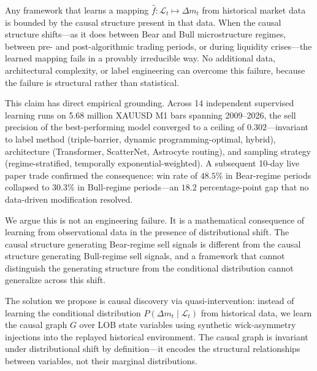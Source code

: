 \documentclass[12pt]{article}
\begin{document}
Any framework that learns a mapping
$\hat{f}: \mathcal{L}_t \mapsto \Delta m_t$
from historical market data is bounded by the causal structure
present in that data.
When the causal structure shifts---as it does between Bear and Bull
microstructure regimes, between pre- and post-algorithmic trading
periods, or during liquidity crises---the learned mapping fails in a
provably irreducible way.
No additional data, architectural complexity, or label engineering
can overcome this failure, because the failure is structural rather
than statistical.

This claim has direct empirical grounding.
Across 14 independent supervised learning runs on 5.68 million
XAUUSD M1 bars spanning 2009--2026, the sell precision of the
best-performing model converged to a ceiling of $0.302$---invariant
to label method (triple-barrier, dynamic programming-optimal, hybrid),
architecture (Transformer, ScatterNet, Astrocyte routing),
and sampling strategy (regime-stratified, temporally exponential-weighted).
A subsequent 10-day live paper trade confirmed the consequence:
win rate of $48.5\%$ in Bear-regime periods collapsed to $30.3\%$
in Bull-regime periods---an $18.2$ percentage-point gap that no
data-driven modification resolved.

We argue this is not an engineering failure.
It is a mathematical consequence of learning from observational data
in the presence of distributional shift.
The causal structure generating Bear-regime sell signals is different
from the causal structure generating Bull-regime sell signals,
and a framework that cannot distinguish the generating structure from
the conditional distribution cannot generalize across this shift.

The solution we propose is causal discovery via quasi-intervention:
instead of learning the conditional distribution
$P(\Delta m_t \mid \mathcal{L}_t)$ from historical data,
we learn the causal graph $G$ over LOB state variables using
synthetic wick-asymmetry injections into the replayed historical
environment.
The causal graph is invariant under distributional shift by
definition---it encodes the structural relationships between variables,
not their marginal distributions.
\end{document}

